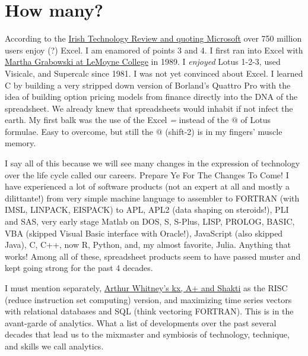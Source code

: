 \documentclass[
]{book}
\begin{document}
\hypertarget{how-many}{%
\section{How many?}\label{how-many}}

According to the \href{https://irishtechnews.ie/seven-reasons-why-excel-is-still-used-by-half-a-billion-people-worldwide/?__cf_chl_jschl_tk__=eae1fe306ae27d3c9013b3704732878b80fc40f3-1616828018-0-AT1moxdZF6mKZLmtRhwzMYiVaKyU0bEe2Kz5ftdXTKKKtNdWjF6EH2e2blKxl4oVSpuFZbzH-mNHukGtzFU29btUpDwqUKJvi9xyIjQO2DmcXQ5OgccXl-AuKvdAhk9DltuuYjjrNzeh4fVzX8UvaT5nwAEAgONZ3H3GSh31P4tILL2x5OQsLXC2YFwcpthCsLENuLjGg0zZErvhaeOTbXpwVuKHBHPkZV5sZEq0wRZS6dIlxtzhO-g07UukzOtBi6GlAF_ctySgFuZ0yOwH7cFr8CzWiAUsP_GHqca5nOzJ-rbPuRMi9oc60Cb7cs7XlwM5cpxrwszbftEeCzYOV3QYkxFFKt8coSEzj5fetcnep_Fh7kEyR7xtuS5cXK_mZs8f8OkanlEyk7HesLVi0KxvIEmxk4XG1qZz8gH0DFdXYhQ2oFcLXdh4G-8gKYcwaDuvC4Ykkn2ybSU-sfazfgMLzKKIzAYgw-4r_gYvo2XG}{Irish Technology Review and quoting Microsoft} over 750 million users enjoy (?) Excel. I am enamored of points 3 and 4. I first ran into Excel with \href{}{Martha Grabowski at LeMoyne College} in 1989. I \emph{enjoyed} Lotus 1-2-3, used Visicalc, and Supercalc since 1981. I was not yet convinced about Excel. I learned C by building a very stripped down version of Borland's Quattro Pro with the idea of building option pricing models from finance directly into the DNA of the spreadsheet. We already knew that spreadsheets would inhabit if not infect the earth. My first balk was the use of the Excel \emph{=} instead of the \(@\) of Lotus formulae. Easy to overcome, but still the \(@\) (shift-2) is in my fingers' muscle memory.

I say all of this because we will see many changes in the expression of technology over the life cycle called our careers. Prepare Ye For The Changes To Come! I have experienced a lot of software products (not an expert at all and mostly a dilittante!) from very simple machine language to assembler to FORTRAN (with IMSL, LINPACK, EISPACK) to APL, APL2 (data shaping on steroids!), PLI and SAS, very early stage Matlab on DOS, S, S-Plus, LISP, PROLOG, BASIC, VBA (skipped Visual Basic interface with Oracle!), JavaScript (also skipped Java), C, C++, now R, Python, and, my almost favorite, Julia. Anything that works! Among all of these, spreadsheet products seem to have passed muster and kept going strong for the past 4 decades.

I must mention separately, \href{https://www.efinancialcareers.co.uk/news/2019/11/shakti-arthur-whitney}{Arthur Whitney's kx, A+ and Shakti} as the RISC (reduce instruction set computing) version, and maximizing time series vectors with relational databases and SQL (think vectoring FORTRAN). This is in the avant-garde of analytics. What a list of developments over the past several decades that lead us to the mixmaster and symbiosis of technology, technique, and skills we call analytics.
\end{document}
